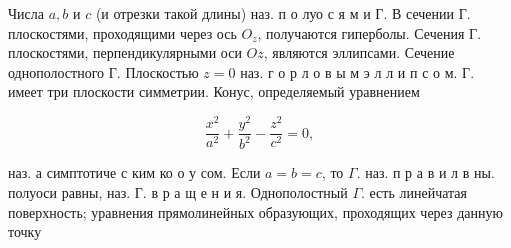 \documentclass[10pt]{article}
\begin{document}
Числа $a, b$ и $c$ (и отрезки такой длины) наз. п о луо с я м и Г. В сечении Г. плоскостями, проходящими через ось $O_{z}$, получаются гиперболы. Сечения Г. плоскостями, перпендикулярными оси $O z$, являются эллипсами. Сечение однополостного $Г$. Плоскостью $z=0$ наз. г о р л о в ы м э л л и п с о м. Г. имеет три плоскости симметрии. Конус, определяемый уравнением



\[

\frac{x^{2}}{a^{2}}+\frac{y^{2}}{b^{2}}-\frac{z^{2}}{c^{2}}=0,

\]



наз. а симптотиче с ким ко о у сом. Если $a=b=c$, то $\Gamma$. наз. п р а в и л в ны. полуоси равны, наз. Г. в р а щ е н и я. Однополостный $\Gamma$. есть линейчатая поверхность; уравнения прямолинейных образующих, проходящих через данную точку
\end{document}
